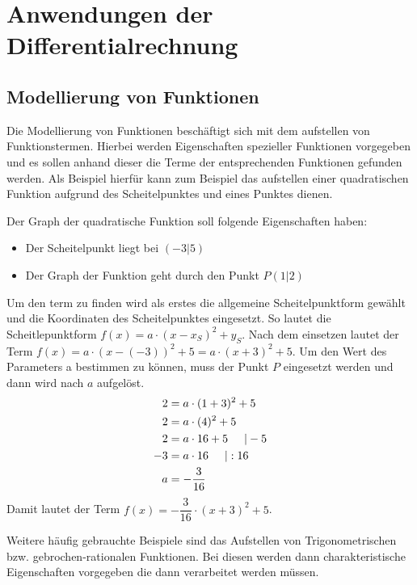  \section{Anwendungen der Differentialrechnung}
 \subsection{Modellierung von Funktionen}
 Die Modellierung von Funktionen beschäftigt sich mit dem aufstellen von Funktionstermen. Hierbei werden Eigenschaften spezieller Funktionen vorgegeben und es sollen anhand dieser die Terme der entsprechenden Funktionen gefunden werden. Als Beispiel hierfür kann zum Beispiel das aufstellen einer quadratischen Funktion aufgrund des Scheitelpunktes und eines Punktes dienen.
 \begin{bsp}{}{}
Der Graph der quadratische Funktion soll folgende Eigenschaften haben:
\begin{itemize}
    \item Der Scheitelpunkt liegt bei $(-3|5)$
    \item Der Graph der Funktion geht durch den Punkt $P(1|2)$
\end{itemize}
Um den term zu finden wird als erstes die allgemeine Scheitelpunktform gewählt und die Koordinaten des Scheitelpunktes eingesetzt. So lautet die Scheitlepunktform $f(x) = a\cdot \left(x-x_S\right)^2 +y_S$. Nach dem einsetzen lautet der Term $f(x) = a\cdot \left(x-(-3)\right)^2 +5 = a\cdot \left(x+3\right)^2 +5 $. Um den Wert des Parameters a bestimmen zu können, muss der Punkt $P$ eingesetzt werden und dann wird nach $a$ aufgelöst.
\begin{equation*}
    \begin{split}
        2&= a\cdot (1+3)^2+5\\
        2&= a\cdot (4)^2 +5\\
        2&= a\cdot 16 +5 \hspace{0.5cm} | - 5\\
        -3&= a\cdot 16  \hspace{0.5cm} | : 16\\
        a&=-\dfrac{3}{16}
    \end{split}
\end{equation*}
Damit lautet der Term $f(x) = -\dfrac{3}{16} \cdot \left(x+3\right)^2 +5$.
 \end{bsp}
 Weitere häufig gebrauchte Beispiele sind das Aufstellen von Trigonometrischen  bzw. gebrochen-rationalen Funktionen. Bei diesen werden dann charakteristische Eigenschaften vorgegeben die dann verarbeitet werden müssen. 
